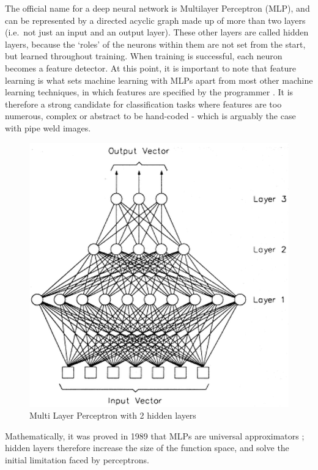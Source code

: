 \documentclass[a4paper,11pt]{article}
\begin{document}
The official name for a deep neural network is Multilayer Perceptron (MLP), and can be represented by a directed acyclic graph made up of more than two layers (i.e.\ not just an input and an output layer). These other layers are called hidden layers, because the `roles' of the neurons within them are not set from the start, but learned throughout training. When training is successful, each neuron becomes a feature detector. At this point, it is important to note that feature learning is what sets machine learning with MLPs apart from most other machine learning techniques, in which features are specified by the programmer \cite{DL-book}. It is therefore a strong candidate for classification tasks where features are too numerous, complex or abstract to be hand-coded - which is arguably the case with pipe weld images.\\ 

\begin{figure}[h!]
	\centering
	\includegraphics[scale=0.4]{images/MLP.png}
	\caption{Multi Layer Perceptron with 2 hidden layers}
    \label{f12}
\end{figure}

Mathematically, it was proved in 1989 that MLPs are universal approximators \cite{MLP-univ-approx}; hidden layers therefore increase the size of the function space, and solve the initial limitation faced by perceptrons. \\
\end{document}
